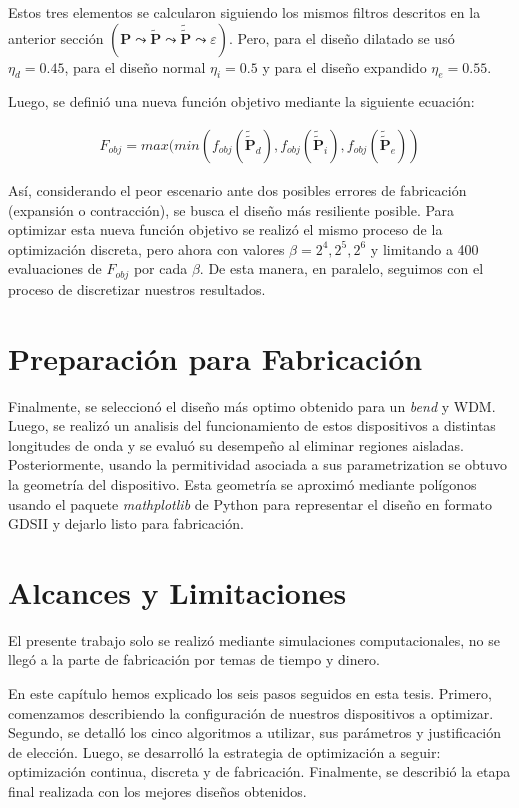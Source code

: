 Estos tres elementos se calcularon siguiendo los mismos filtros descritos en la anterior sección
$(\boldsymbol{P} \mathrel{\leadsto} \widetilde{\boldsymbol{P}} \mathrel{\leadsto}
\widetilde{\widetilde{\boldsymbol{P}}} \mathrel{\leadsto} \varepsilon)$.
Pero, para el diseño dilatado se usó $\eta_d = 0.45$, para el diseño normal $\eta_i = 0.5$ y
para el diseño expandido $\eta_e = 0.55$.

Luego, se definió una nueva función objetivo mediante la siguiente ecuación:

\begin{equation}
  \begin{split}
    F_{obj} = max(min(
    f_{obj}(\widetilde{\widetilde{\boldsymbol{P}}}_{d}),
    f_{obj}(\widetilde{\widetilde{\boldsymbol{P}}}_{i}),
    f_{obj}(\widetilde{\widetilde{\boldsymbol{P}}}_{e})
    )
  \end{split}
  \label{eq:final-fom}
\end{equation}

Así, considerando el peor escenario ante dos posibles errores de fabricación (expansión o contracción),
se busca el diseño más resiliente posible.
Para optimizar esta nueva función objetivo se realizó el mismo proceso de la optimización discreta, pero ahora
con valores $\beta = 2^4, 2^5, 2^6$ y limitando a 400 evaluaciones de $F_{obj}$ por cada $\beta$. 
De esta manera, en paralelo, seguimos con el proceso de discretizar
nuestros resultados.

\section{Preparación para Fabricación}

Finalmente, se seleccionó el diseño más optimo obtenido para un \emph{bend} y WDM.
Luego, se realizó un analisis del funcionamiento de estos dispositivos a distintas longitudes de onda
y se evaluó su desempeño al eliminar regiones aisladas.
Posteriormente, usando la permitividad asociada a sus parametrization se obtuvo la geometría del dispositivo.
Esta geometría se aproximó mediante polígonos usando el paquete \emph{mathplotlib} de Python
para representar el diseño en formato GDSII y dejarlo listo para fabricación.

\section{Alcances y Limitaciones}

El presente trabajo solo se realizó mediante simulaciones computacionales, no se llegó a la parte de
fabricación por temas de tiempo y dinero.

En este capítulo hemos explicado los seis pasos seguidos en esta tesis.
Primero, comenzamos describiendo la configuración de nuestros dispositivos a optimizar.
Segundo, se detalló los cinco algoritmos a utilizar, sus parámetros y justificación de elección.
Luego, se desarrolló la estrategia de optimización a seguir: optimización continua, discreta y de fabricación.
Finalmente, se describió la etapa final realizada con los mejores diseños obtenidos.
